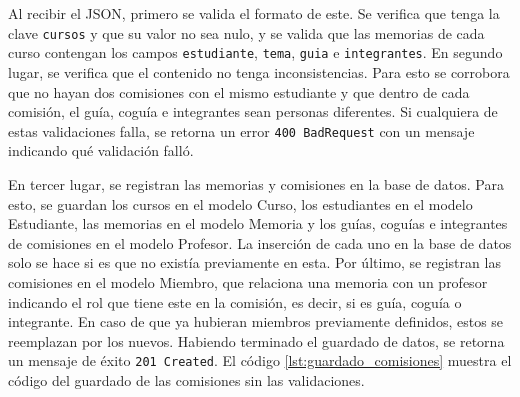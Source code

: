 Al recibir el JSON, primero se valida el formato de este. Se verifica que tenga la clave
\texttt{cursos} y que su valor no sea nulo, y se valida que las memorias de cada curso
contengan los campos \texttt{estudiante}, \texttt{tema}, \texttt{guia} e
\texttt{integrantes}. En segundo lugar, se verifica que el contenido no tenga
inconsistencias. Para esto se corrobora que no hayan dos comisiones con el mismo
estudiante y que dentro de cada comisión, el guía, coguía e integrantes sean personas
diferentes. Si cualquiera de estas validaciones falla, se retorna un error
\verb|400 BadRequest| con un mensaje indicando qué validación falló.

En tercer lugar, se registran las memorias y comisiones en la base de datos. Para esto,
se guardan los cursos en el modelo Curso, los estudiantes en el modelo Estudiante,
las memorias en el modelo Memoria y los guías, coguías e integrantes de comisiones en el
modelo Profesor. La inserción de cada uno en la base de datos solo se hace si es que no
existía previamente en esta. Por último, se registran las comisiones en el modelo Miembro,
que relaciona una memoria con un profesor indicando el rol que tiene este en la comisión,
es decir, si es guía, coguía o integrante. En caso de que ya hubieran miembros
previamente definidos, estos se reemplazan por los nuevos. Habiendo terminado el guardado
de datos, se retorna un mensaje de éxito \verb|201 Created|. El código
\ref{lst:guardado_comisiones} muestra el código del guardado de las comisiones sin las
validaciones.


\newpage

